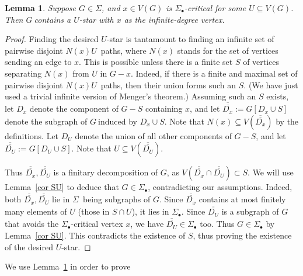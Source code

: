 \documentclass{article}
\newcommand{\SU}{\ensuremath{\Sig_\bullet}}
\newcommand{\dbar}[1]{\ensuremath{\overline{\overline{#1}}}}
\newcommand{\Sig}{\ensuremath{\Sigma}}
\newtheorem{lemma}[proposition]{Lemma}
\newcommand{\pths}[2]{\ensuremath{#1}\text{--}\ensuremath{#2}~paths}
\newcommand{\g}{\ensuremath{G\ }}
\newcommand{\G}{\ensuremath{G}}
\newcommand{\Lr}[1]{Lemma~\ref{#1}}
\begin{document}
\begin{lemma} \label{lem SU star}
Suppose $G \in \Sig$, and $x\in V(G)$ is \SU-critical for some $U\subseteq V(G)$. Then \g contains a $U$-star with $x$ as the infinite-degree vertex.
\end{lemma}
\begin{proof}
Finding the desired $U$-star is tantamount to finding an infinite set of pairwise disjoint \pths{N(x)}{U}, where $N(x)$ stands for the set of vertices sending an edge to $x$. This is possible unless there is a finite set $S$ of vertices separating $N(x)$ from $U$ in $G-x$. Indeed, if there is a finite and maximal set of pairwise disjoint \pths{N(x)}{U}, then their union forms such an $S$. (We have just used a trivial infinite version of Menger's theorem.) Assuming such an $S$ exists, let $D_x$ denote the component of $G -S$ containing $x$, and let $\dbar{D_x}:= G[D_x \cup S]$ denote the subgraph of \g induced by $D_x \cup S$. Note that $N(x)\subseteq V(\dbar{D_x})$ by the definitions. Let $D_U$ denote the union of all other components of $G -S$, and let $\dbar{D_U}:=G[D_U \cup S]$. Note that $U\subseteq V(\dbar{D_U})$. 

Thus $\dbar{D_x},\dbar{D_U}$ is a finitary decomposition of \G, as $V(\dbar{D_x} \cap \dbar{D_U}) \subset S$. We will use \Lr{cor SU} to deduce that $G\in \SU$, contradicting our assumptions. Indeed, both $\dbar{D_x}, \dbar{D_U}$ lie in \Sig\ being subgraphs of \G. Since $\dbar{D_x}$ contains at most finitely many elements of $U$ (those in $S\cap U$), it lies in \SU. Since $\dbar{D_U}$ is a subgraph of \g that avoids the \SU-critical vertex $x$, we have $\dbar{D_U} \in \SU$ too. Thus $G\in \SU$ by \Lr{cor SU}. This contradicts the existence of $S$, thus proving the existence of the desired $U$-star.



\end{proof}

We use \Lr{lem SU star} in order to prove 
\end{document}
